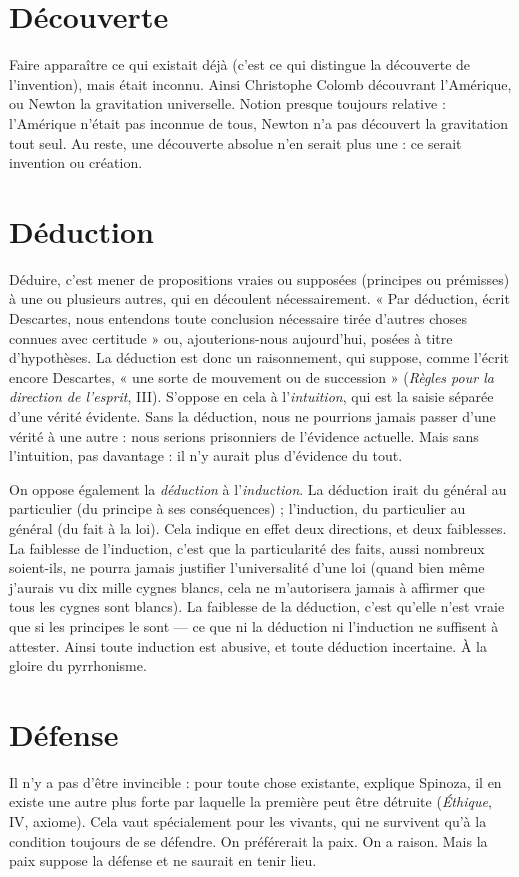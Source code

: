 \section{Découverte}
Faire apparaître ce qui existait déjà (c’est ce qui distingue
la découverte de l'invention), mais était inconnu. Ainsi
Christophe Colomb découvrant l'Amérique, ou Newton la gravitation universelle.
Notion presque toujours relative : l'Amérique n’était pas inconnue de
tous, Newton n’a pas découvert la gravitation tout seul. Au reste, une découverte
absolue n’en serait plus une : ce serait invention ou création.

\section{Déduction}
Déduire, c’est mener de propositions vraies ou supposées
(principes ou prémisses) à une ou plusieurs autres, qui en
découlent nécessairement. « Par déduction, écrit Descartes, nous entendons
toute conclusion nécessaire tirée d’autres choses connues avec certitude » ou,
ajouterions-nous aujourd’hui, posées à titre d’hypothèses. La déduction est
donc un raisonnement, qui suppose, comme l'écrit encore Descartes, « une
sorte de mouvement ou de succession » ({\it Règles pour la direction de l'esprit}, III).
S’oppose en cela à l’{\it intuition}, qui est la saisie séparée d’une vérité évidente. Sans
la déduction, nous ne pourrions jamais passer d’une vérité à une autre : nous
serions prisonniers de l’évidence actuelle. Mais sans l'intuition, pas davantage :
il n’y aurait plus d’évidence du tout.

On oppose également la {\it déduction} à l'{\it induction}. La déduction irait du
général au particulier (du principe à ses conséquences) ; l'induction, du particulier
au général (du fait à la loi). Cela indique en effet deux directions, et deux
faiblesses. La faiblesse de l’induction, c’est que la particularité des faits, aussi
nombreux soient-ils, ne pourra jamais justifier l’universalité d’une loi (quand
bien même j'aurais vu dix mille cygnes blancs, cela ne m’autorisera jamais à
affirmer que tous les cygnes sont blancs). La faiblesse de la déduction, c’est
qu’elle n’est vraie que si les principes le sont — ce que ni la déduction ni l’induction
ne suffisent à attester. Ainsi toute induction est abusive, et toute déduction
incertaine. À la gloire du pyrrhonisme.

\section{Défense}
Il n’y a pas d’être invincible : pour toute chose existante, explique
Spinoza, il en existe une autre plus forte par laquelle la première
peut être détruite ({\it Éthique}, IV, axiome). Cela vaut spécialement pour les
vivants, qui ne survivent qu’à la condition toujours de se défendre. On préférerait
la paix. On a raison. Mais la paix suppose la défense et ne saurait en tenir
lieu.

